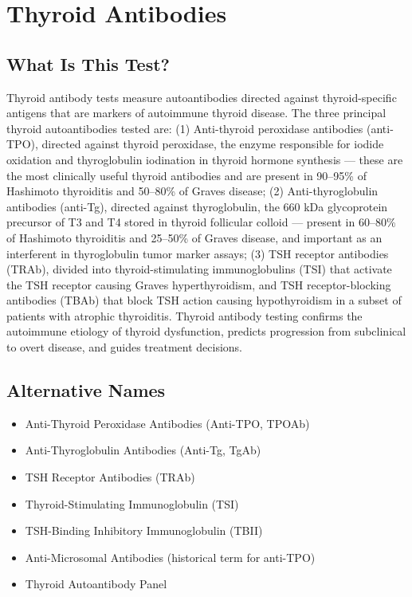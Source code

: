 \chapter{Thyroid Antibodies}

\section*{What Is This Test?}
Thyroid antibody tests measure autoantibodies directed against thyroid-specific antigens that are markers of autoimmune thyroid disease. The three principal thyroid autoantibodies tested are: (1) Anti-thyroid peroxidase antibodies (anti-TPO), directed against thyroid peroxidase, the enzyme responsible for iodide oxidation and thyroglobulin iodination in thyroid hormone synthesis --- these are the most clinically useful thyroid antibodies and are present in 90--95\% of Hashimoto thyroiditis and 50--80\% of Graves disease; (2) Anti-thyroglobulin antibodies (anti-Tg), directed against thyroglobulin, the 660 kDa glycoprotein precursor of T3 and T4 stored in thyroid follicular colloid --- present in 60--80\% of Hashimoto thyroiditis and 25--50\% of Graves disease, and important as an interferent in thyroglobulin tumor marker assays; (3) TSH receptor antibodies (TRAb), divided into thyroid-stimulating immunoglobulins (TSI) that activate the TSH receptor causing Graves hyperthyroidism, and TSH receptor-blocking antibodies (TBAb) that block TSH action causing hypothyroidism in a subset of patients with atrophic thyroiditis. Thyroid antibody testing confirms the autoimmune etiology of thyroid dysfunction, predicts progression from subclinical to overt disease, and guides treatment decisions.

\section*{Alternative Names}
\begin{itemize}
  \item Anti-Thyroid Peroxidase Antibodies (Anti-TPO, TPOAb)
  \item Anti-Thyroglobulin Antibodies (Anti-Tg, TgAb)
  \item TSH Receptor Antibodies (TRAb)
  \item Thyroid-Stimulating Immunoglobulin (TSI)
  \item TSH-Binding Inhibitory Immunoglobulin (TBII)
  \item Anti-Microsomal Antibodies (historical term for anti-TPO)
  \item Thyroid Autoantibody Panel
\end{itemize}
